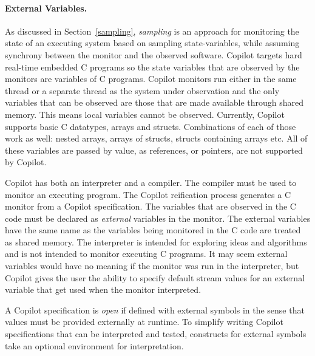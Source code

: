 \paragraph{External Variables.}


As discussed in Section~\ref{sampling}, \emph{sampling} is an approach
for monitoring the state of an executing system based on sampling
state-variables, while assuming synchrony between the monitor and the
observed software. Copilot targets hard real-time embedded C programs
so the state variables that are observed by the monitors are variables
of C programs. Copilot monitors run either in the same thread or a
separate thread as the system under observation and the only variables
that can be observed are those that are made available through shared
memory. This means local variables cannot be observed. Currently,
Copilot supports basic C datatypes, arrays and structs. Combinations of each of
those work as well: nested arrays, arrays of structs, structs containing arrays
etc. All of these variables are passed by value, as references, or pointers,
are not supported by Copilot.


Copilot has both an interpreter and a compiler. The compiler must be
used to monitor an executing program. The Copilot reification process
generates a C monitor from a Copilot specification. The variables that
are observed in the C code must be declared as \emph{external}
variables in the monitor. The external variables have the same name as
the variables being monitored in the C code are treated as shared
memory. The interpreter is intended for exploring ideas and algorithms
and is not intended to monitor executing  C
programs. It may seem external variables would have no meaning if the
monitor was run in the interpreter, but Copilot gives the user the
ability to specify default stream values for an external variable that
get used when the monitor interpreted.

 A Copilot specification is \emph{open} if defined with external symbols in the
sense that values must be provided externally at runtime.  To simplify writing
Copilot specifications that can be interpreted and tested, constructs for
external symbols take an optional environment for interpretation.

